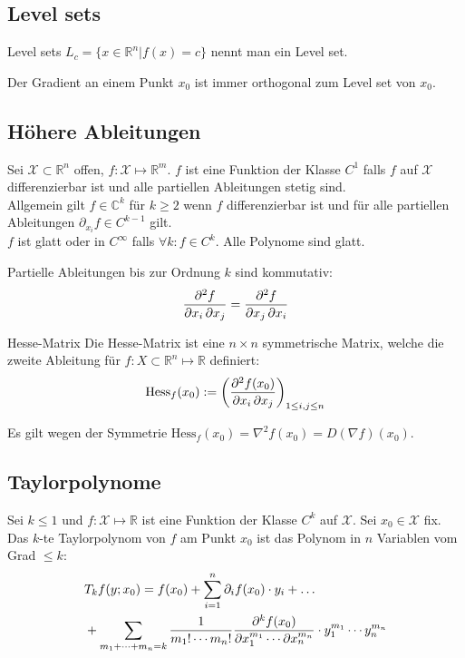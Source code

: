\documentclass[a4paper,10pt]{article}
\def\R{\mathbb{R}}
\def\C{\mathbb{C}}
\def\X{\mathcal{X}}
\begin{document}
\subsection{Level sets}

\begin{mainbox}{Level sets}
  $L_c = \{ x \in \mathbb{R}^n | f(x) = c \}$ nennt man ein Level set.
\end{mainbox}

Der Gradient an einem Punkt $x_0$ ist immer orthogonal zum Level set von $x_0$. 

\subsection{Höhere Ableitungen}
Sei \(\X \subset \R^n\) offen, \(f: \X \mapsto \R^m\). \(f\) ist eine Funktion der Klasse \(C^1\) falls \(f\) auf \(\X\) differenzierbar ist und alle partiellen Ableitungen stetig sind. \\
Allgemein gilt \(f \in \C^k\) für \(k \ge 2\) wenn \(f\) differenzierbar ist und für alle partiellen Ableitungen \(\partial_{x_i} f \in C^{k-1}\) gilt. \\
\(f\) ist glatt oder in \(C^\infty\) falls \(\forall k: f \in C^k \). Alle Polynome sind glatt.

Partielle Ableitungen bis zur Ordnung \(k\) sind kommutativ:
$$\pdv{f}{x_i, x_j} = \pdv{f}{ x_j, x_i}$$

\begin{mainbox}{Hesse-Matrix}
  Die Hesse-Matrix ist eine \(n \times n\) symmetrische Matrix, welche die zweite Ableitung für $f: X \subset \mathbb{R}^n \mapsto \mathbb{R}$ definiert:
  \[\text{Hess}_f(x_0) := \left(\pdv{f(x_0)}{x_i, x_j}\right)_{1\le i,j \le n}\] 
\end{mainbox}

Es gilt wegen der Symmetrie $\text{Hess}_f(x_0) = \nabla^2 f(x_0) = D(\nabla f)(x_0)$.

\subsection{Taylorpolynome}
Sei \(k \le 1\) und \(f: \X \mapsto \R\) ist eine Funktion der Klasse \(C^k\) auf \(\X\). Sei \(x_0 \in \X\) fix. Das \(k\)-te Taylorpolynom von \(f\) am Punkt \(x_0\) ist das Polynom in \(n\) Variablen vom Grad \(\le k\):
\begin{align*}
  &T_k f(y; x_0) = f(x_0) + \sum_{i=1}^n \partial_i f(x_0) \cdot y_i + \dots \\
  &+ \sum_{m_1 + \cdots + m_n = k} \frac{1}{m_1! \cdots m_n!} \pdv{^k f(x_0) }{x_1^{m_1} \cdots \partial x_n^{m_n}} \cdot y_1^{m_1} \cdots y_n^{m_n}
\end{align*}
\end{document}
